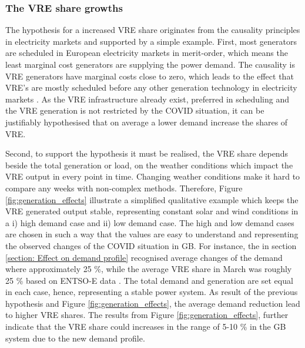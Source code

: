 \documentclass[energies,article,submit,moreauthors,pdftex]{Definitions/mdpi}
\begin{document}
\subsubsection{The VRE share growths}
The hypothesis for a increased VRE share originates from the causality principles in electricity markets and supported by a simple example. 
First, most generators are scheduled in European electricity markets in merit-order, which means the least marginal cost generators are supplying the power demand. The causality is VRE generators have marginal costs close to zero, which leads to the effect that VRE's are mostly scheduled before any other generation technology in electricity markets \cite{Winkler2016ImpactMatter}. As the VRE infrastructure already exist, preferred in scheduling and the VRE generation is not restricted by the COVID situation, it can be justifiably hypothesised that on average a lower demand increase the shares of VRE. 

Second, to support the hypothesis it must be realised, the VRE share depends beside the total generation or load, on the weather conditions which impact the VRE output in every point in time. Changing weather conditions make it hard to compare any weeks with non-complex methods. Therefore, Figure \ref{fig:generation_effects} illustrate a simplified qualitative example which keeps the VRE generated output stable, representing constant solar and wind conditions in a i) high demand case and ii) low demand case. The high and low demand cases are chosen in such a way that the values are easy to understand and representing the observed changes of the COVID situation in GB. For instance, the in section \ref{section: Effect on demand profile} recognised average changes of the demand where approximately 25 \%, while the average VRE share in March was roughly 25 \% based on ENTSO-E data \cite{ENTSO-E2020ENTSO-EPlatform}. The total demand and generation are set equal in each case, hence, representing a stable power system. As result of the previous hypothesis and Figure \ref{fig:generation_effects}, the average demand reduction lead to higher VRE shares. The results from Figure \ref{fig:generation_effects}, further indicate that the VRE share could increases in the range of 5-10 \% in the GB system due to the new demand profile.
\end{document}
